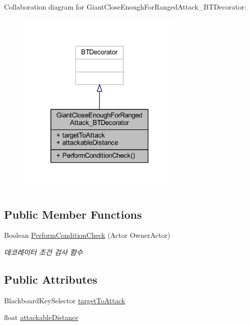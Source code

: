 Collaboration diagram for Giant\+Close\+Enough\+For\+Ranged\+Attack\+\_\+\+B\+T\+Decorator\+:\nopagebreak
\begin{figure}[H]
\begin{center}
\leavevmode
\includegraphics[width=225pt]{class_giant_close_enough_for_ranged_attack___b_t_decorator__coll__graph}
\end{center}
\end{figure}
\subsection*{Public Member Functions}
\begin{DoxyCompactItemize}
\item 
Boolean \hyperlink{class_giant_close_enough_for_ranged_attack___b_t_decorator_a44e018d77f40f5aa61a4304b8e8cf15e}{Perform\+Condition\+Check} (Actor Owner\+Actor)
\begin{DoxyCompactList}\small\item\em 데코레이터 조건 검사 함수 \end{DoxyCompactList}\end{DoxyCompactItemize}
\subsection*{Public Attributes}
\begin{DoxyCompactItemize}
\item 
Blackboard\+Key\+Selector \hyperlink{class_giant_close_enough_for_ranged_attack___b_t_decorator_a1cc248f03397ce0e086ac9b16bd732e1}{target\+To\+Attack}
\item 
float \hyperlink{class_giant_close_enough_for_ranged_attack___b_t_decorator_a994ad90e6d00df363f635eee1fcf2146}{attackable\+Distance}
\end{DoxyCompactItemize}


